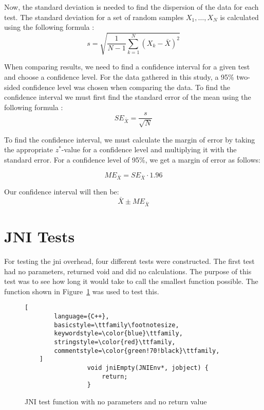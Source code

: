 Now, the standard deviation is needed to find the dispersion of the data for each test. The standard deviation for a set of random samples $X_1, \dots, X_N$ is calculated using the following formula \cite[p.~302]{olofsson2012probability}:
\begin{equation*}
    s = \sqrt{\frac{1}{N - 1} \sum\limits_{k = 1}^{N}\left(X_k - \bar{X}\right)^2}
\end{equation*}

When comparing results, we need to find a confidence interval for a given test and choose a confidence level. For the data gathered in this study, a 95\% two-sided confidence level was chosen when comparing the data. To find the confidence interval we must first find the standard error of the mean using the following formula \cite[p.~304]{olofsson2012probability}:
\begin{equation*}
    SE_{\bar{X}} = \frac{s}{\sqrt{N}}
\end{equation*}

To find the confidence interval, we must calculate the margin of error by taking the appropriate $z^*$-value for a confidence level and multiplying it with the standard error. For a confidence level of 95\%, we get a margin of error as follows:

\begin{equation*}
    ME_{\bar{X}} = SE_{\bar{X}} \cdot 1.96
\end{equation*}

Our confidence interval will then be:
\begin{equation*}
    \bar{X} \pm ME_{\bar{X}}
\end{equation*}

\section{JNI Tests}
For testing the \gls{jni} overhead, four different tests were constructed. The first test had no parameters, returned void and did no calculations. The purpose of this test was to see how long it would take to call the smallest function possible. The function shown in Figure~\ref{fig:jni:empty} was used to test this.

\begin{figure}[H]
\begin{lstlisting}[
        language={C++},
        basicstyle=\ttfamily\footnotesize,
        keywordstyle=\color{blue}\ttfamily,
        stringstyle=\color{red}\ttfamily,
        commentstyle=\color{green!70!black}\ttfamily,
    ]
                 void jniEmpty(JNIEnv*, jobject) {
                     return;
                 }
\end{lstlisting}
\caption{JNI test function with no parameters and no return value}
\label{fig:jni:empty}
\end{figure}

